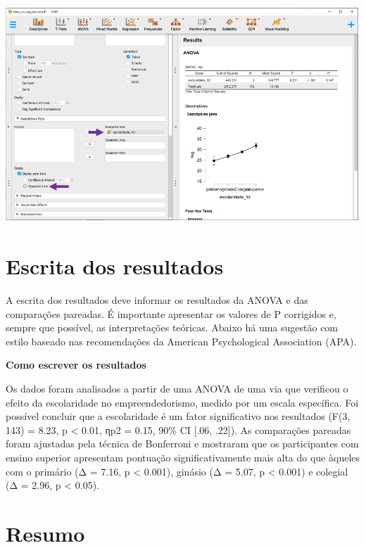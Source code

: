 \documentclass[
]{book}
\begin{document}
\includegraphics{./img/cap_anova_posthoc_plots2.png}

\hypertarget{escrita-dos-resultados-4}{%
\section{Escrita dos resultados}\label{escrita-dos-resultados-4}}

A escrita dos resultados deve informar os resultados da ANOVA e das comparações pareadas. É importante apresentar os valores de P corrigidos e, sempre que possível, as interpretações teóricas. Abaixo há uma sugestão com estilo baseado nas recomendações da American Psychological Association (APA).

\begin{writing}
\textbf{Como escrever os resultados}

Os dados foram analisados a partir de uma ANOVA de uma via que verificou
o efeito da escolaridade no empreendedorismo, medido por um escala
específica. Foi possível concluir que a escolaridade é um fator
significativo nos resultados (F(3, 143) = 8.23, p \textless{} 0.01, ηp2
= 0.15, 90\% CI {[}.06, .22{]}). As comparações pareadas foram ajustadas
pela técnica de Bonferroni e mostraram que os participantes com ensino
superior apresentam pontuação significativamente mais alta do que
àqueles com o primário (Δ = 7.16, p \textless{} 0.001), ginásio (Δ =
5.07, p \textless{} 0.001) e colegial (Δ = 2.96, p \textless{} 0.05).
\end{writing}

\hypertarget{resumo-6}{%
\section{Resumo}\label{resumo-6}}
\end{document}

